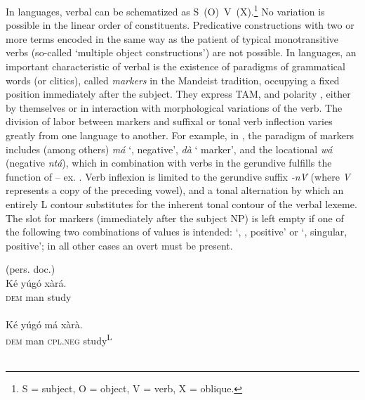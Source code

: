 \documentclass[output=paper]{langsci/langscibook}
\begin{document}
In  languages, verbal  can be schematized as S~(O)~V~(X).\footnote{S = subject, O = object, V = verb, X = oblique.} No variation is possible in the linear order of constituents. Predicative constructions with two or more terms encoded in the same way as the patient of typical monotransitive verbs (so-called ‘multiple object constructions’) are not possible.
In  languages, an important characteristic of verbal  is the existence of paradigms of grammatical words (or clitics), called \textit{ markers} in the Mandeist tradition, occupying a fixed position immediately after the subject. They express TAM,  and polarity , either by themselves or in interaction with morphological variations of the verb. The division of labor between  markers and suffixal or tonal verb inflection varies greatly from one  language to another.
  For example, in , the paradigm of  markers includes (among others) \textit{má} ‘, negative’, \textit{dà} ‘ marker’, and the locational  \textit{wá} (negative \textit{ntá}), which in combination with verbs in the gerundive fulfills the function of   – ex. . Verb inflexion is limited to the gerundive suffix \textit{-n\'{V}} (where \textit{V} represents a copy of the preceding vowel), and a tonal alternation by which an entirely L contour substitutes for the inherent tonal contour of the verbal lexeme. The slot for  markers (immediately after the subject NP) is left empty if one of the following two combinations of values is intended: ‘, , positive’ or ‘,  singular, positive’; in all other cases an overt  must be present.

\ea%
    \label{ex:creissels:3}    
    (pers. doc.)\\

   \ea
    \gll   Ké  yúgó  xàrá. \\
      \textsc{dem}  man  study\\
      \\

   \ex
    \gll   Ké  yúgó  má  xàrà.\\
      \textsc{dem}  man  \textsc{cpl.neg}  study\textsuperscript{\tiny L}\\
      \\
\end{document}
